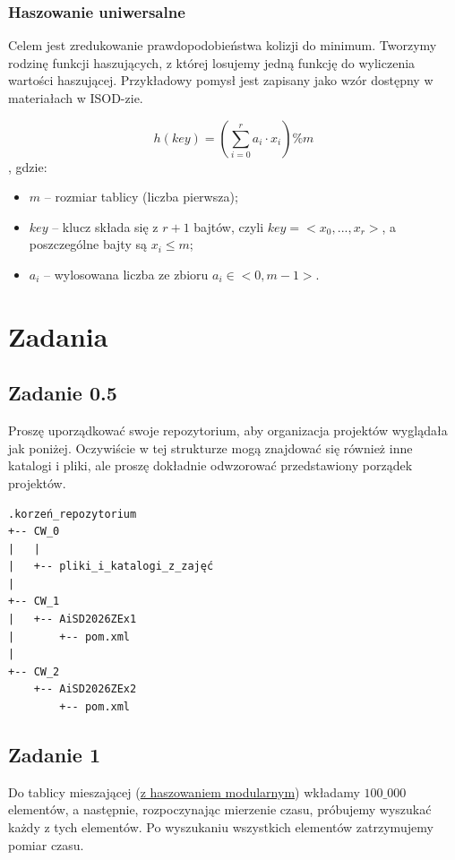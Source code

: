 \documentclass[twoside]{article}
\begin{document}
\subsubsection{Haszowanie uniwersalne}
Celem jest zredukowanie prawdopodobieństwa kolizji do minimum. 
Tworzymy rodzinę funkcji haszujących, z której losujemy jedną funkcję do wyliczenia wartości
haszującej.
Przykładowy pomysł jest zapisany jako wzór dostępny w materiałach w ISOD-zie.

$$h(key) = (\sum_{i=0}^{r} a_i \cdot x_i) \% m$$
, gdzie:

\begin{itemize}
    \item $m$ -- rozmiar tablicy (liczba pierwsza);
    \item $key$ -- klucz składa się z $r+1$ bajtów, czyli $key = <x_0, ..., x_r>$,
    a poszczególne bajty są $x_i \leq m$;
    \item $a_i$ -- wylosowana liczba ze zbioru $a_i \in <0, m-1>$.
    
\end{itemize}

\section{Zadania}

\subsection{Zadanie 0.5}
Proszę uporządkować swoje repozytorium, aby organizacja projektów wyglądała jak poniżej. 
Oczywiście w tej strukturze mogą znajdować się również inne katalogi i pliki, ale proszę
dokładnie odwzorować przedstawiony porządek projektów.

\begin{verbatim}
.korzeń_repozytorium
+-- CW_0
|   |
|   +-- pliki_i_katalogi_z_zajęć
|
+-- CW_1
|   +-- AiSD2026ZEx1
|       +-- pom.xml
|
+-- CW_2
    +-- AiSD2026ZEx2
        +-- pom.xml
\end{verbatim}

\newpage

\subsection{Zadanie 1}
Do tablicy mieszającej (\underline{z haszowaniem modularnym}) wkładamy $100\_000$ elementów,
a następnie, rozpoczynając mierzenie czasu, próbujemy wyszukać każdy z tych elementów.
Po wyszukaniu wszystkich elementów zatrzymujemy pomiar czasu.
\end{document}
